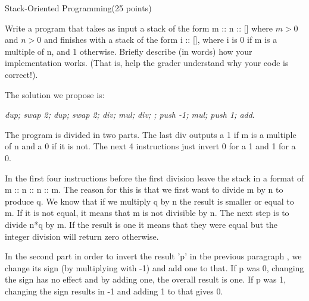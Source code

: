 \documentclass{article}
\begin{document}
\begin{question}{Stack-Oriented Programming}{(25 points)}
\begin{subquestion}
  \end{subquestion}
  
  
  
  \begin{subquestion}
     Write a program that takes as input a stack of the form m :: n :: [] where $m \gt 0$ and $n \gt 0$ and finishes
    with a stack of the form i :: [], where i is 0 if m is a multiple of n, and 1 otherwise. Briefly describe
    (in words) how your implementation works. (That is, help the grader understand why your code is
    correct!).
    
    The solution we propose is:
    
    \emph{dup; swap 2; dup; swap 2; div; mul; div; ; push -1; mul; push 1; add}.
    
    The program is divided in two parts. The last div outputs a 1 if m is a multiple of n and a 0 if it is not. The next 4 instructions just invert 0 for a 1 and 1 for a 0.
    
    In the first four instructions before the first division leave the stack in a format of m :: n :: n :: m. The reason for this is that we first want to divide m by n to produce q. We know that if we multiply q by n the result is smaller or equal to m. If it is not equal, it means that m is not divisible by n. The next step is to divide n*q by m. If the result is one it means that they were equal but the integer division will return zero otherwise.
    
    In the second part in order to invert the result 'p' in the previous paragraph , we change its sign (by multiplying with -1) and add one to that. If p was 0, changing the sign has no effect and by adding one, the overall result is one. If p was 1, changing the sign results in -1 and adding 1 to that gives 0.
    
    
  \end{subquestion}
  
    
\end{question}
\end{document}
